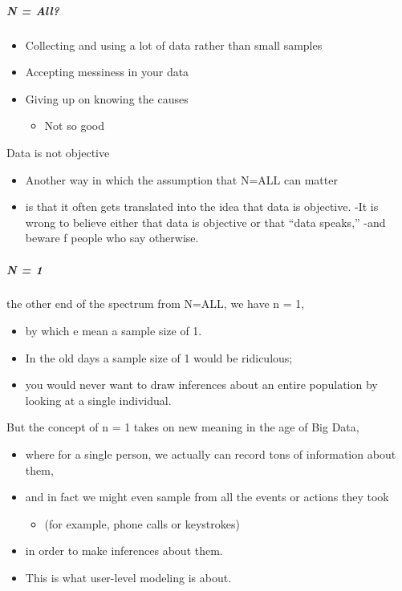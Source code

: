 \documentclass[]{article}
\providecommand{\tightlist}{%
  \setlength{\itemsep}{0pt}\setlength{\parskip}{0pt}}
\let\oldsubparagraph\subparagraph
\renewcommand{\subparagraph}[1]{\oldsubparagraph{#1}\mbox{}}
\begin{document}
\subparagraph{N = All?}\label{n-all}

\begin{itemize}
\tightlist
\item
  Collecting and using a lot of data rather than small samples\\
\item
  Accepting messiness in your data
\item
  Giving up on knowing the causes

  \begin{itemize}
  \tightlist
  \item
    Not so good
  \end{itemize}
\end{itemize}

Data is not objective

\begin{itemize}
\tightlist
\item
  Another way in which the assumption that N=ALL can matter
\item
  is that it often gets translated into the idea that data is objective.
  -It is wrong to believe either that data is objective or that ``data
  speaks,'' -and beware f people who say otherwise.
\end{itemize}

\subparagraph{N = 1}\label{n-1}

the other end of the spectrum from N=ALL, we have n = 1,

\begin{itemize}
\tightlist
\item
  by which e mean a sample size of 1.
\item
  In the old days a sample size of 1 would be ridiculous;
\item
  you would never want to draw inferences about an entire population by
  looking at a single individual.
\end{itemize}

But the concept of n = 1 takes on new meaning in the age of Big Data,

\begin{itemize}
\tightlist
\item
  where for a single person, we actually can record tons of information
  about them,
\item
  and in fact we might even sample from all the events or actions they
  took

  \begin{itemize}
  \tightlist
  \item
    (for example, phone calls or keystrokes)
  \end{itemize}
\item
  in order to make inferences about them.
\item
  This is what user-level modeling is about.
\end{itemize}
\end{document}
